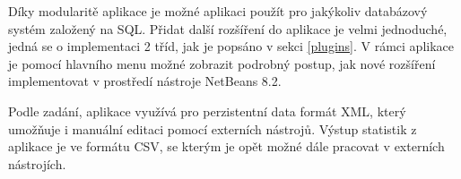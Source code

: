 \documentclass[czech,bachelor,public,dept460,male,cpdeclaration,twoside]{diploma}
\begin{document}
Díky modularitě aplikace je možné aplikaci použít pro jakýkoliv databázový systém založený na SQL. Přidat další rozšíření do aplikace je velmi jednoduché, jedná se o implementaci 2 tříd, jak je popsáno v sekci \ref{plugins}. V rámci aplikace je pomocí hlavního menu možné zobrazit podrobný postup, jak nové rozšíření implementovat v prostředí nástroje NetBeans 8.2.

Podle zadání, aplikace využívá pro perzistentní data formát XML, který umožňuje i manuální editaci pomocí externích nástrojů. Výstup statistik z aplikace je ve formátu CSV, se kterým je opět možné dále pracovat v externích nástrojích. 
\end{document}
